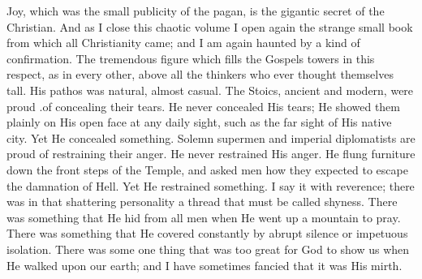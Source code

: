\documentclass{book}
\begin{document}
Joy, which was the small publicity of the pagan, is the gigantic secret of the Christian. And as I close this chaotic volume I open again the strange small book from which all Christianity came; and I am again haunted by a kind of confirmation. The tremendous figure which fills the Gospels towers in this respect, as in every other, above all the thinkers who ever thought themselves tall. His pathos was natural, almost casual. The Stoics, ancient and modern, were proud .of concealing their tears. He never concealed His tears; He showed them plainly on His open face at any daily sight, such as the far sight of His native city. Yet He concealed something. Solemn supermen and imperial diplomatists are proud of restraining their anger. He never restrained His anger. He flung furniture down the front steps of the Temple, and asked men how they expected to escape the damnation of Hell. Yet He restrained something. I say it with reverence; there was in that shattering personality a thread that must be called shyness. There was something that He hid from all men when He went up a mountain to pray. There was something that He covered constantly by abrupt silence or impetuous isolation. There was some one thing that was too great for God to show us when He walked upon our earth; and I have sometimes fancied that it was His mirth.
\end{document}
